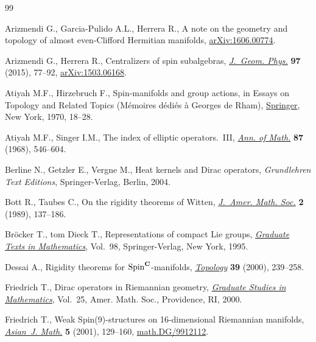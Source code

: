 \documentclass[10pt,a4paper]{amsart}
\numberwithin{equation}{section}
\begin{document}
\begin{thebibliography}{99}
\footnotesize\itemsep=0pt

Arizmendi G., Garcia-Pulido A.L., Herrera R., A note on the geometry and
 topology of almost even-{C}lif\/ford {H}ermitian manifolds,
 \href{http://arxiv.org/abs/1606.00774}{arXiv:1606.00774}.

Arizmendi G., Herrera R., Centralizers of spin subalgebras, \href{https://doi.org/10.1016/j.geomphys.2015.07.002}{\textit{J.~Geom.
 Phys.}} \textbf{97} (2015), 77--92, \href{http://arxiv.org/abs/1503.06168}{arXiv:1503.06168}.

Atiyah M.F., Hirzebruch F., Spin-manifolds and group actions, in Essays on
 {T}opology and {R}elated {T}opics ({M}\'emoires d\'edi\'es \`a {G}eorges de
 {R}ham), \href{https://doi.org/10.1007/978-3-642-49197-9_3}{Springer}, New York, 1970, 18--28.

Atiyah M.F., Singer I.M., The index of elliptic operators.~{III}, \href{https://doi.org/10.2307/1970717}{\textit{Ann.
 of Math.}} \textbf{87} (1968), 546--604.

Berline N., Getzler E., Vergne M., Heat kernels and {D}irac operators,
 \textit{Grundlehren Text Editions}, Springer-Verlag, Berlin, 2004.

Bott R., Taubes C., On the rigidity theorems of {W}itten, \href{https://doi.org/10.2307/1990915}{\textit{J.~Amer.
 Math. Soc.}} \textbf{2} (1989), 137--186.

Br\"ocker T., tom Dieck T., Representations of compact {L}ie groups,
 \href{https://doi.org/10.1007/978-3-662-12918-0}{\textit{Graduate Texts in Mathematics}}, Vol.~98, Springer-Verlag, New York,
 1995.

Dessai A., Rigidity theorems for {${\rm Spin}^{\bf C}$}-manifolds,
 \href{https://doi.org/10.1016/S0040-9383(99)00005-1}{\textit{Topology}} \textbf{39} (2000), 239--258.

Friedrich T., Dirac operators in {R}iemannian geometry, \href{https://doi.org/10.1090/gsm/025}{\textit{Graduate
 Studies in Mathematics}}, Vol.~25, Amer. Math. Soc., Providence,
 RI, 2000.

Friedrich T., Weak {S}pin(9)-structures on 16-dimensional {R}iemannian
 manifolds, \href{https://doi.org/10.4310/AJM.2001.v5.n1.a9}{\textit{Asian~J. Math.}} \textbf{5} (2001), 129--160,
 \href{http://arxiv.org/abs/math.DG/9912112}{math.DG/9912112}.


\end{thebibliography}
\end{document}
